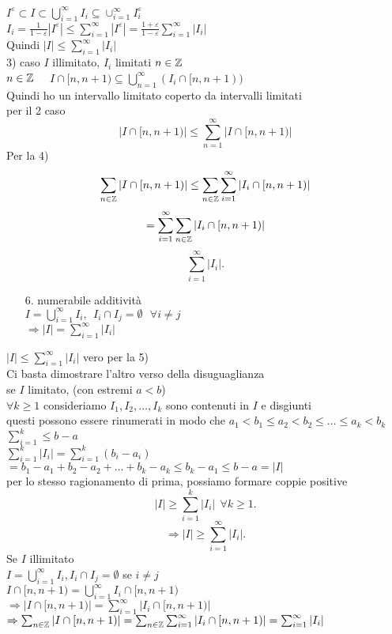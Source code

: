 \documentclass{article}
\begin{document}
  $I^\varepsilon\subset I\subset\bigcup^\infty_{i = 1} I_i\subseteq\cup^\infty_{i=1}I^\varepsilon_i$\\
  $I_i = \frac{1}{1-\varepsilon}|I^\varepsilon| \leq \sum^\infty_{i=1}|I^\varepsilon| = \frac{1 + \varepsilon}{1-\varepsilon} \sum^\infty_{i=1}|I_i|$\\
  Quindi $|I|\leq \sum^\infty_{i=1}|I_i|$\\
  3) caso $I$ illimitato, $I_i$ limitati $n\in\mathbb{Z}$\\
  $n\in\mathbb{Z}$ \ \ $ I\cap [n, n + 1)\subseteq \bigcup^ \infty_{n=1}(I_i\cap[n,n+1))$\\
  Quindi ho un intervallo limitato coperto da intervalli limitati\\
  per il 2 caso
   \[
  |I\cap[n,n+1)|\leq \sum^\infty_{n=1} |I\cap[n,n+1)|
  \] 
  Per la 4)
  \[
  \sum_{n\in\mathbb{Z}} |I\cap[n,n+1)|\leq \sum_{n\in\mathbb{Z}} \sum^\infty_{i=1}|I_i\cap[n,n+1)|
  \]
  \[
	  = \sum^\infty_{i=1} \sum_{n\in\mathbb{Z}} |I_i\cap[n,n+1)| 
  \] 
  \[
   \sum^\infty_{i=1} |I_i|
  .\] 
\begin{enumerate}
	\item[6.] numerabile additività\\
		$I = \bigcup^\infty_{i=1} I_i, \ \ I_i\cap I_j = \emptyset\ \ \ \forall i\neq j$ \\
		 $ \Rightarrow |I| = \sum^\infty_{i=1}|I_i|$ \\
\end{enumerate}
\begin{dimo}
	$|I| \leq \sum^\infty_{i=1}|I_i|$ vero per la 5)\\
	Ci basta dimostrare l'altro verso della disuguaglianza\\
	 se $I$ limitato,  (con estremi $a<b$)\\
	  $\forall k\geq 1$ consideriamo  $I_1,I_2,\ldots,I_k$ sono contenuti in $I$ e disgiunti\\
	  questi possono essere rinumerati in modo che $a_1 < b_1\leq a_2 < b_2 \leq\ldots\leq a_k < b_k$\\
	  $ \sum^k_{i=1}\leq b -a $\\
	  $ \sum^k_{i=1}|I_i| = \sum^k_{i=1}(b_i - a_i)$ \\
	  $= b_1 - a_1 + b_2 - a_2 + \ldots + b_k - a_k\leq b_k-a_1 \leq b - a= |I|$\\
	  per lo stesso ragionamento di prima, possiamo formare coppie positive\\
	  \[
	  |I| \geq \sum^k_{i=1} |I_i| \ \ \forall k\geq 1
	  .\] 
	  \[
	   \Rightarrow |I|\geq \sum^\infty_{i=1}|I_i|
	  .\] 
	  Se $I$ illimitato\\
	  $I = \bigcup^\infty_{i=1}I_i, I_i\cap I_j = \emptyset $ se $i\neq j$\\
	  $I\cap [n,n+1) = \bigcup^\infty_{i=1}I_i\cap[n,n+1)$\\
	   $ \Rightarrow |I\cap[n,n+1)| = \sum^\infty_{i=1}|I_i\cap[n,n+1)|$ \\
	   $ \Rightarrow \sum_{n\in\mathbb{Z}}|I\cap[n,n+1)| = \sum_{n\in\mathbb{Z}} \sum^\infty_{i=1}|I_i\cap[n,n+1)| = \sum^\infty_{i=1}|I_i|$\\
\end{dimo}
\end{document}
